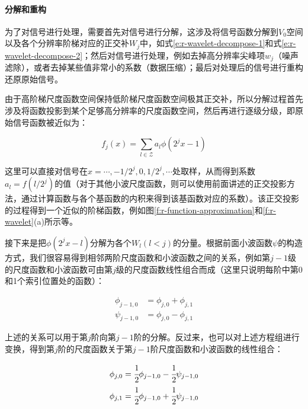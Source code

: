 \paragraph{分解和重构}
为了对信号进行处理，需要首先对信号进行分解，这涉及将信号函数分解到$V_0$空间以及各个分辨率阶梯对应的正交补$W_j$中，如式\ref{e:r-wavelet-decompose-1}和式\ref{e:r-wavelet-decompose-2}；然后对信号进行处理，例如去掉高分辨率尖峰项$w_j$（噪声滤除），或者去掉某些值非常小的系数（数据压缩）；最后对处理后的信号进行重构还原原始信号。

由于高阶梯尺度函数空间保持低阶梯尺度函数空间极其正交补，所以分解过程首先涉及将函数投影到某个足够高分辨率的尺度函数空间，然后再进行逐级分级，即原始信号函数被近似为：

\begin{equation}
	f_j(x)=\sum_{l\in\mathcal{Z}}a_l\phi(2^{j}x-1)
\end{equation}

\noindent 这里可以直接对信号在$x=\cdots,-1/2^{j},0,1/2^{j},\cdots$处取样，从而得到系数$a_l=f(l/2^{j})$的值（对于其他小波尺度函数，则可以使用前面讲述的正交投影方法，通过计算函数与各个基函数的内积来得到该基函数对应的系数）。该正交投影的过程得到一个近似的阶梯函数，例如图\ref{f:r-function-approximation}和\ref{f:r-wavelet}(a)所示等。

接下来是把$\phi(2^{j}x-l)$分解为各个$W_l(l<j)$的分量。根据前面小波函数$\psi$的构造方式，我们很容易得到相邻两阶尺度函数和小波函数之间的关系，例如第$j-1$级的尺度函数和小波函数可由第$j$级的尺度函数线性组合而成（这里只说明每阶中第0和1个索引位置处的函数）：

\begin{equation}\label{e:r-harr-decompose}
	\begin{aligned}
		\phi_{j-1,0}&=\phi_{j,0}+\phi_{j,1}\\
		\psi_{j-1,0}&=\phi_{j,0}-\phi_{j,1}
	\end{aligned}
\end{equation}

\noindent 上述的关系可以用于第$j$阶向第$j-1$阶的分解。反过来，也可以对上述方程组进行变换，得到第$j$阶的尺度函数关于第$j-1$阶尺度函数和小波函数的线性组合：

\begin{equation}\label{e:r-harr-reconstruction}
\begin{aligned}
	\phi_{j,0}&= \cfrac{1}{2}\phi_{j-1,0}- \cfrac{1}{2}\psi_{j-1,0}\\
	\phi_{j,1}&= \cfrac{1}{2}\phi_{j-1,0}+ \cfrac{1}{2}\psi_{j-1,0}
\end{aligned}
\end{equation}

